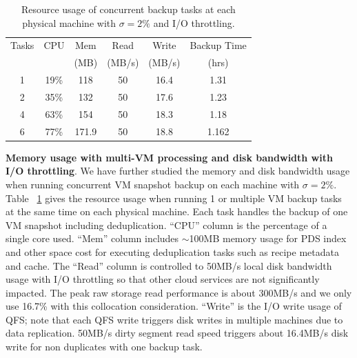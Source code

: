 \begin{table}
    \begin{tabular}{|c|c|c|c|c|c|}
    \hline
    Tasks & CPU & Mem &Read &  Write  & Backup Time  \\ 
    & & (MB)          &(MB/s) &  (MB/s) & (hrs) \\ \hline
    1     & 19\% & 118 & 50 & 16.4 & 1.31\\ \hline
    2     & 35\% & 132 &50  & 17.6 & 1.23\\ \hline
    4     & 63\% & 154&50   & 18.3 & 1.18\\ \hline
    6     & 77\% & 171.9 & 50 &  18.8 & 1.162\\ \hline
    \end{tabular}
\caption{Resource usage of concurrent backup tasks at each physical machine with $\sigma=2\%$ and I/O throttling.}
\label{tab:resource_usage}
\end{table}

{\bf Memory usage with multi-VM processing and disk bandwidth with  I/O throttling}. 
We have further studied the memory and disk bandwidth usage 
when running concurrent VM snapshot backup on each machine with $\sigma=2\%$. 
Table ~\ref{tab:resource_usage} gives the resource usage  when
running 1 or multiple  VM backup tasks at the same time on each physical machine. 
Each task handles the backup of one VM snapshot including deduplication.
``CPU'' column is the percentage of a single core used. 
``Mem'' column includes $\sim$100MB memory usage for PDS index and other space cost for executing deduplication tasks such as 
recipe metadata and cache. 
The ``Read'' column is controlled to 50MB/s local disk bandwidth usage with I/O throttling so that other 
cloud services are not significantly impacted.
The peak raw storage read performance is about 300MB/s and we only use 16.7\% with this collocation consideration.
``Write'' is the I/O write usage of QFS; note that each QFS write triggers disk writes in multiple machines due to
data replication.     50MB/s dirty segment read speed triggers about 16.4MB/s disk write for non duplicates with one backup task.

